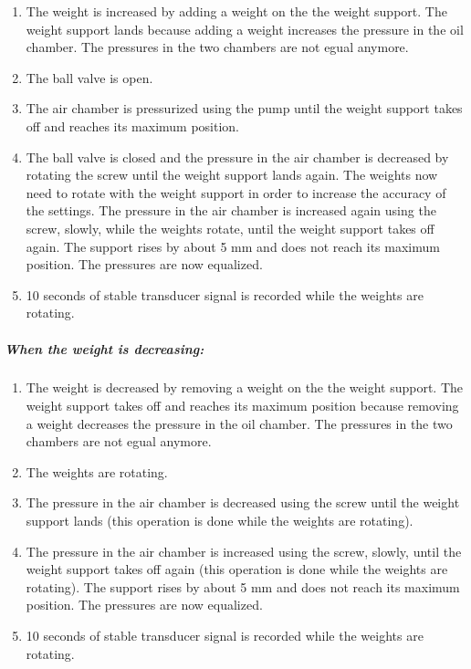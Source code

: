 \begin{enumerate}
\item The weight is increased by adding a weight on the the weight
  support. The weight support lands because adding
  a weight increases the pressure in the oil chamber. The
  pressures in the two chambers are not egual anymore.
\item The ball valve is open.
\item The air chamber is pressurized using the pump until the
  weight support takes off and reaches its maximum position.
\item The ball valve is closed and the pressure in the air chamber
  is decreased by rotating the screw until the weight support
  lands again. The weights now need to rotate with the weight
  support in order to increase the accuracy of the settings. The
  pressure in the air chamber is increased again using the screw,
  slowly, while the weights rotate, until the weight support takes
  off again. The support rises by about 5 mm and does not reach
  its maximum position. The pressures are now equalized.
\item 10 seconds of stable transducer signal is recorded while the
  weights are rotating.
\end{enumerate}

\subparagraph{When the weight is decreasing:}

\begin{enumerate}
\item The weight is decreased by removing a weight on the the weight
  support. The weight support takes off and reaches
  its maximum position because removing a weight decreases the
  pressure in the oil chamber. The pressures in the two chambers
  are not egual anymore.
\item The weights are rotating.
\item The pressure in the air chamber is decreased using the screw
  until the weight support lands (this operation is done while
  the weights are rotating).
\item The pressure in the air chamber is increased using the screw,
  slowly, until the weight support takes off again (this operation
  is done while the weights are rotating). The support rises by
  about 5 mm and does not reach its maximum position. The pressures
  are now equalized.
\item 10 seconds of stable transducer signal is recorded while the
  weights are rotating.
\end{enumerate}

